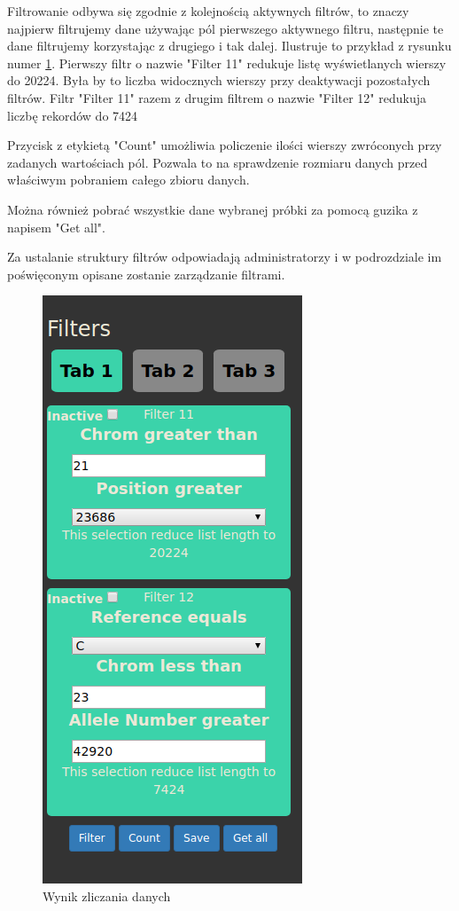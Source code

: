 \documentclass[a4paper,12pt,twoside]{article}
\begin{document}
\newpage

Filtrowanie odbywa się zgodnie z kolejnością aktywnych filtrów, to znaczy najpierw filtrujemy
dane używając pól pierwszego aktywnego filtru, następnie te dane filtrujemy korzystając z drugiego i tak dalej. Ilustruje to przykład z rysunku numer \ref{fig:countpic}. Pierwszy filtr o nazwie "Filter 11" redukuje listę wyświetlanych wierszy do 20224. Była by to liczba widocznych wierszy przy deaktywacji pozostałych filtrów. Filtr "Filter 11" razem z drugim filtrem o nazwie "Filter 12"
redukuja liczbę rekordów do 7424

Przycisk z etykietą "Count" umożliwia policzenie ilości wierszy zwróconych przy zadanych wartościach pól. Pozwala to na sprawdzenie rozmiaru danych przed właściwym pobraniem całego zbioru danych.

Można również pobrać wszystkie dane wybranej próbki za pomocą guzika z napisem "Get all".

Za ustalanie struktury filtrów odpowiadają administratorzy i w podrozdziale im poświęconym
opisane zostanie zarządzanie filtrami.


\begin{figure}
  \centering
  \includegraphics{obrazy/aplikacja/count.png}
  \caption{Wynik zliczania danych}
  \label{fig:countpic}
\end{figure}
\end{document}
